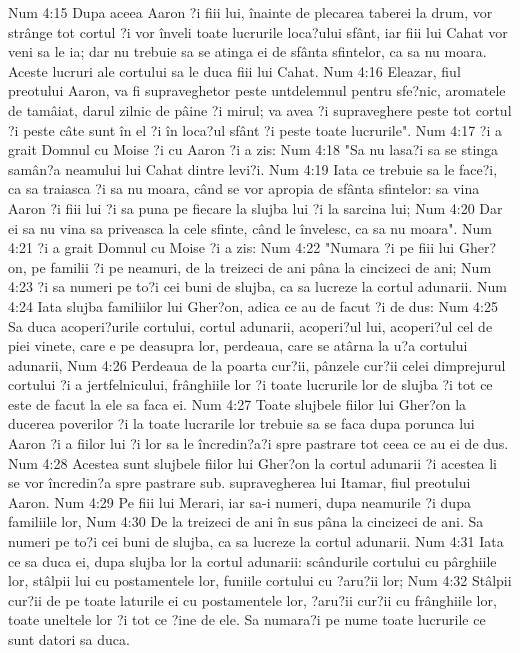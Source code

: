 Num 4:15  Dupa aceea Aaron ?i fiii lui, înainte de plecarea taberei la drum, vor strânge tot cortul ?i vor înveli toate lucrurile loca?ului sfânt, iar fiii lui Cahat vor veni sa le ia; dar nu trebuie sa se atinga ei de sfânta sfintelor, ca sa nu moara. Aceste lucruri ale cortului sa le duca fiii lui Cahat.
Num 4:16  Eleazar, fiul preotului Aaron, va fi supraveghetor peste untdelemnul pentru sfe?nic, aromatele de tamâiat, darul zilnic de pâine ?i mirul; va avea ?i supraveghere peste tot cortul ?i peste câte sunt în el ?i în loca?ul sfânt ?i peste toate lucrurile".
Num 4:17  ?i a grait Domnul cu Moise ?i cu Aaron ?i a zis:
Num 4:18  "Sa nu lasa?i sa se stinga samân?a neamului lui Cahat dintre levi?i.
Num 4:19  Iata ce trebuie sa le face?i, ca sa traiasca ?i sa nu moara, când se vor apropia de sfânta sfintelor: sa vina Aaron ?i fiii lui ?i sa puna pe fiecare la slujba lui ?i la sarcina lui;
Num 4:20  Dar ei sa nu vina sa priveasca la cele sfinte, când le învelesc, ca sa nu moara".
Num 4:21  ?i a grait Domnul cu Moise ?i a zis:
Num 4:22  "Numara ?i pe fiii lui Gher?on, pe familii ?i pe neamuri, de la treizeci de ani pâna la cincizeci de ani;
Num 4:23  ?i sa numeri pe to?i cei buni de slujba, ca sa lucreze la cortul adunarii.
Num 4:24  Iata slujba familiilor lui Gher?on, adica ce au de facut ?i de dus:
Num 4:25  Sa duca acoperi?urile cortului, cortul adunarii, acoperi?ul lui, acoperi?ul cel de piei vinete, care e pe deasupra lor, perdeaua, care se atârna la u?a cortului adunarii,
Num 4:26  Perdeaua de la poarta cur?ii, pânzele cur?ii celei dimprejurul cortului ?i a jertfelnicului, frânghiile lor ?i toate lucrurile lor de slujba ?i tot ce este de facut la ele sa faca ei.
Num 4:27  Toate slujbele fiilor lui Gher?on la ducerea poverilor ?i la toate lucrarile lor trebuie sa se faca dupa porunca lui Aaron ?i a fiilor lui ?i lor sa le încredin?a?i spre pastrare tot ceea ce au ei de dus.
Num 4:28  Acestea sunt slujbele fiilor lui Gher?on la cortul adunarii ?i acestea li se vor încredin?a spre pastrare sub. supravegherea lui Itamar, fiul preotului Aaron.
Num 4:29  Pe fiii lui Merari, iar sa-i numeri, dupa neamurile ?i dupa familiile lor,
Num 4:30  De la treizeci de ani în sus pâna la cincizeci de ani. Sa numeri pe to?i cei buni de slujba, ca sa lucreze la cortul adunarii.
Num 4:31  Iata ce sa duca ei, dupa slujba lor la cortul adunarii: scândurile cortului cu pârghiile lor, stâlpii lui cu postamentele lor, funiile cortului cu ?aru?ii lor;
Num 4:32  Stâlpii cur?ii de pe toate laturile ei cu postamentele lor, ?aru?ii cur?ii cu frânghiile lor, toate uneltele lor ?i tot ce ?ine de ele. Sa numara?i pe nume toate lucrurile ce sunt datori sa duca.

